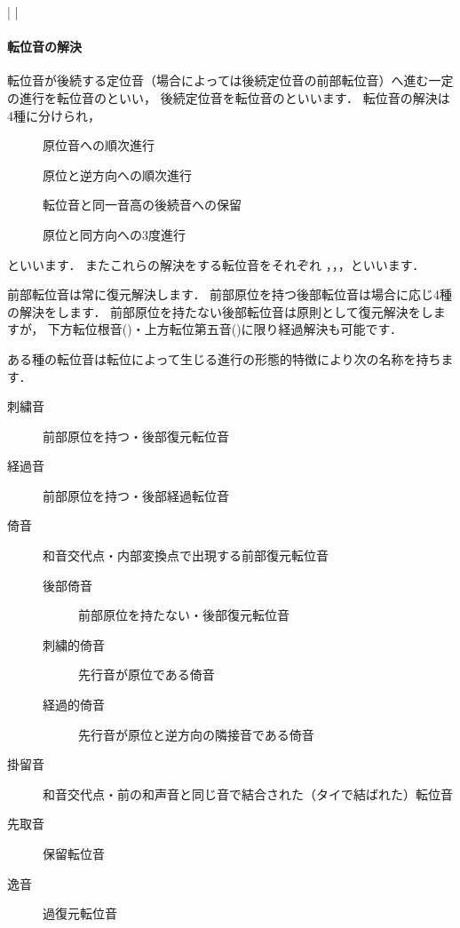\documentclass[dvipdfmx,uplatex,b5paper,openany,jbase=12Q,nomag*,textwidth-limit=44%
               ]{gachimuchi}[2020/05/05]
\begin{document}
\begin{Music}[0.6\linewidth]
  \nostartrule%
  \Startpiece%
  \znotes%
  \en\NOtes%
  \en\bar%
  \NOTes%
  \en\doublebar%
  \znotes%
  \en\NOtes%
  \en\bar%
  \NOtes%
  \en\NOtes%
  \en\setdoublebar%
  \endpiece%
\end{Music}

\paragraph{転位音の解決}
転位音が後続する定位音（場合によっては後続定位音の前部転位音）へ進む一定の進行を転位音のといい，
後続定位音を転位音のといいます．
転位音の解決は4種に分けられ，
\begin{description}
  \item[] 原位音への順次進行
  \item[] 原位と逆方向への順次進行
  \item[] 転位音と同一音高の後続音への保留
  \item[] 原位と同方向への3度進行
\end{description}
といいます．
またこれらの解決をする転位音をそれぞれ
，，，といいます．

前部転位音は常に復元解決します．
前部原位を持つ後部転位音は場合に応じ4種の解決をします．
前部原位を持たない後部転位音は原則として復元解決をしますが，
下方転位根音()・上方転位第五音()に限り経過解決も可能です．

ある種の転位音は転位によって生じる進行の形態的特徴により次の名称を持ちます．

\begin{description}
  \item[刺繍音] 前部原位を持つ・後部復元転位音
  \item[経過音] 前部原位を持つ・後部経過転位音
  \item[倚音] 和音交代点・内部変換点で出現する前部復元転位音
  \begin{description}
    \item[後部倚音] 前部原位を持たない・後部復元転位音
    \item[刺繍的倚音] 先行音が原位である倚音
    \item[経過的倚音] 先行音が原位と逆方向の隣接音である倚音
  \end{description}
  \item[掛留音] 和音交代点・前の和声音と同じ音で結合された（タイで結ばれた）転位音
  \item[先取音] 保留転位音
  \item[逸音] 過復元転位音
\end{description}
\end{document}
